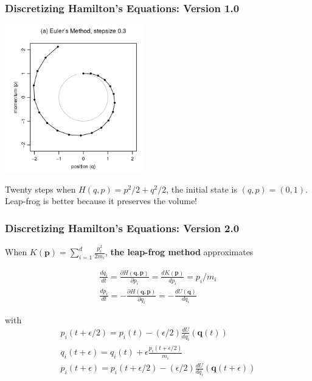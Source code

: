 \documentclass{beamer}
\begin{document}
\begin{frame}
\frametitle{Discretizing Hamilton's Equations: Version 1.0}

\begin{center}
\includegraphics[width=60mm]{eulers_method.png}
\end{center}

Twenty steps when $H(q,p) = p^2/2 + q^2/2$, the initial state is $(q,p) = (0,1)$. Leap-frog is better because it preserves the volume!

\end{frame}
\begin{frame}
\frametitle{Discretizing Hamilton's Equations: Version 2.0}

When $K(\mathbf{p})= \sum_{i=1}^d \frac{p_i^2}{2m_i}$, {\bf the leap-frog method} approximates

\begin{gather}
\frac{dq_i}{dt} = \frac{\partial H(\mathbf{q},\mathbf{p})}{\partial p_i} =  \frac{d K(\mathbf{p}) }{d p_i} = p_i/m_i  \\
\frac{dp_i}{dt} = -\frac{\partial H(\mathbf{q},\mathbf{p})}{\partial q_i} = -\frac{d U(\mathbf{q})}{d q_i} 
\end{gather}

with
\begin{gather}
p_i(t + \epsilon/2) =  p_i(t) - (\epsilon/2) \frac{d U}{d q_i}(\mathbf{q}(t)) \\
q_i(t + \epsilon) = q_i(t ) + \epsilon \frac{p_i(t+\epsilon/2)}{m_i} \\
p_i(t + \epsilon) =  p_i(t + \epsilon/2) - (\epsilon/2) \frac{d U}{d q_i}(\mathbf{q}(t+\epsilon)) 
\end{gather}


\end{frame}
\end{document}
